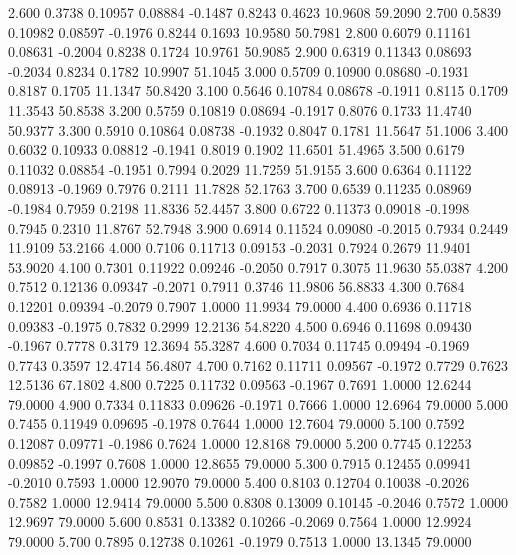    2.600   0.3738   0.10957   0.08884  -0.1487   0.8243   0.4623  10.9608  59.2090
   2.700   0.5839   0.10982   0.08597  -0.1976   0.8244   0.1693  10.9580  50.7981
   2.800   0.6079   0.11161   0.08631  -0.2004   0.8238   0.1724  10.9761  50.9085
   2.900   0.6319   0.11343   0.08693  -0.2034   0.8234   0.1782  10.9907  51.1045
   3.000   0.5709   0.10900   0.08680  -0.1931   0.8187   0.1705  11.1347  50.8420
   3.100   0.5646   0.10784   0.08678  -0.1911   0.8115   0.1709  11.3543  50.8538
   3.200   0.5759   0.10819   0.08694  -0.1917   0.8076   0.1733  11.4740  50.9377
   3.300   0.5910   0.10864   0.08738  -0.1932   0.8047   0.1781  11.5647  51.1006
   3.400   0.6032   0.10933   0.08812  -0.1941   0.8019   0.1902  11.6501  51.4965
   3.500   0.6179   0.11032   0.08854  -0.1951   0.7994   0.2029  11.7259  51.9155
   3.600   0.6364   0.11122   0.08913  -0.1969   0.7976   0.2111  11.7828  52.1763
   3.700   0.6539   0.11235   0.08969  -0.1984   0.7959   0.2198  11.8336  52.4457
   3.800   0.6722   0.11373   0.09018  -0.1998   0.7945   0.2310  11.8767  52.7948
   3.900   0.6914   0.11524   0.09080  -0.2015   0.7934   0.2449  11.9109  53.2166
   4.000   0.7106   0.11713   0.09153  -0.2031   0.7924   0.2679  11.9401  53.9020
   4.100   0.7301   0.11922   0.09246  -0.2050   0.7917   0.3075  11.9630  55.0387
   4.200   0.7512   0.12136   0.09347  -0.2071   0.7911   0.3746  11.9806  56.8833
   4.300   0.7684   0.12201   0.09394  -0.2079   0.7907   1.0000  11.9934  79.0000
   4.400   0.6936   0.11718   0.09383  -0.1975   0.7832   0.2999  12.2136  54.8220
   4.500   0.6946   0.11698   0.09430  -0.1967   0.7778   0.3179  12.3694  55.3287
   4.600   0.7034   0.11745   0.09494  -0.1969   0.7743   0.3597  12.4714  56.4807
   4.700   0.7162   0.11711   0.09567  -0.1972   0.7729   0.7623  12.5136  67.1802
   4.800   0.7225   0.11732   0.09563  -0.1967   0.7691   1.0000  12.6244  79.0000
   4.900   0.7334   0.11833   0.09626  -0.1971   0.7666   1.0000  12.6964  79.0000
   5.000   0.7455   0.11949   0.09695  -0.1978   0.7644   1.0000  12.7604  79.0000
   5.100   0.7592   0.12087   0.09771  -0.1986   0.7624   1.0000  12.8168  79.0000
   5.200   0.7745   0.12253   0.09852  -0.1997   0.7608   1.0000  12.8655  79.0000
   5.300   0.7915   0.12455   0.09941  -0.2010   0.7593   1.0000  12.9070  79.0000
   5.400   0.8103   0.12704   0.10038  -0.2026   0.7582   1.0000  12.9414  79.0000
   5.500   0.8308   0.13009   0.10145  -0.2046   0.7572   1.0000  12.9697  79.0000
   5.600   0.8531   0.13382   0.10266  -0.2069   0.7564   1.0000  12.9924  79.0000
   5.700   0.7895   0.12738   0.10261  -0.1979   0.7513   1.0000  13.1345  79.0000
